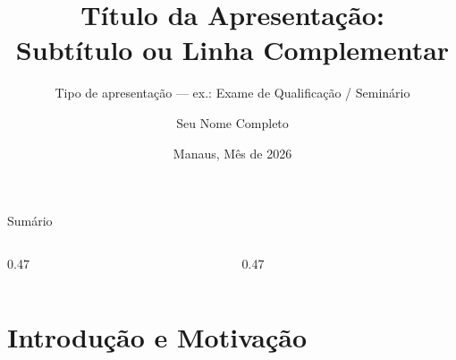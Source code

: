 \documentclass[aspectratio=169, 10pt, brazil]{beamer}
\title{Título da Apresentação:\\
       Subtítulo ou Linha Complementar}
\subtitle{Tipo de apresentação — ex.: Exame de Qualificação / Seminário}
\author[S.\ Nome]{Seu Nome Completo}
\institute[IComp · UFAM]{%
  Instituto de Computação — IComp\\
  Universidade Federal do Amazonas — UFAM
}
\date{Manaus, Mês de 2026}
\begin{document}
\begin{frame}
  \titlepage
\end{frame}

\begin{frame}{Sumário}
  \begin{columns}[T,onlytextwidth]
    \begin{column}{0.47\textwidth}
      \tableofcontents[sections={1-3},hideallsubsections]
    \end{column}
    \begin{column}{0.47\textwidth}
      \tableofcontents[sections={4-6},hideallsubsections]
    \end{column}
  \end{columns}
\end{frame}

\section{Introdução e Motivação}
\end{document}
